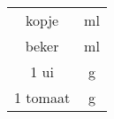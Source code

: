 \begin{tabular}{|c|c|}
    \hline
    \unit[1]{kopje} & \unit[125]{ml} \\
    \unit[1]{beker} & \unit[180]{ml} \\
    1 ui &  \unit[75]{g} \\
    1 tomaat & \unit[70]{g} \\
    \hline
\end{tabular}